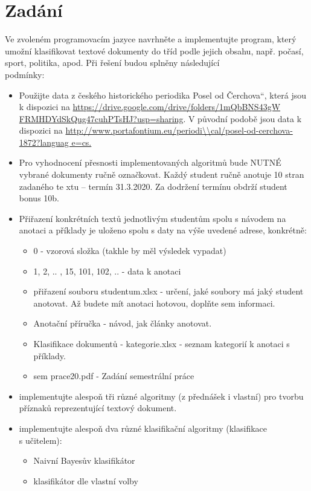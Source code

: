 \documentclass[12pt]{article}
\begin{document}
\section{Zadání}
Ve zvoleném programovacím jazyce navrhněte a implementujte program, který umožní klasifikovat textové dokumenty do tříd podle jejich obsahu, např. počasí,     sport, politika, apod. Při řešení budou splněny následující \\
podmínky:
\begin{itemize}

\item Použijte data z českého historického periodika Posel od Čerchova“, která jsou k dispozici na \url{https://drive.google.com/drive/folders/1mQbBNS43gW    FRMHDYdSkQug47cuhPTsHJ?usp=sharing}. V původní podobě jsou data k dispozici na \url{http://www.portafontium.eu/periodi\\cal/posel-od-cerchova-1872?languag    e=cs.}

\item Pro vyhodnocení přesnosti implementovaných algoritmů bude NUTNÉ vybrané dokumenty ručně označkovat. Každý student ručně anotuje 10 stran zadaného te    xtu –
termín 31.3.2020. Za dodržení termínu obdrží student bonus 10b.

\item Přiřazení konkrétních textů jednotlivým studentům spolu s návodem na anotaci a příklady je uloženo spolu s daty na výše uvedené adrese, konkrétně:
        \begin{itemize}
        \item 0 - vzorová složka (takhle by měl výsledek vypadat)
        \item 1, 2, .. , 15, 101, 102, .. - data k anotaci
        \item přiřazení souboru studentum.xlsx - určení, jaké soubory má jaký student   anotovat. Až budete mít anotaci hotovou, doplňte sem informaci.
        \item Anotační příručka - návod, jak články anotovat.
        \item Klasifikace dokumentů - kategorie.xlsx - seznam kategorií k anotaci s příklady.
        \item sem prace20.pdf - Zadání semestrální práce
        \end{itemize}

\item implementujte alespoň tři různé algoritmy (z přednášek i vlastní) pro tvorbu příznaků reprezentující textový dokument.

\item implementujte alespoň dva různé klasifikační algoritmy (klasifikace\\ s učitelem):
        \begin{itemize}
        \item Naivní Bayesův klasifikátor
        \item klasifikátor dle vlastní volby
        \end{itemize}


\end{itemize}
\end{document}
